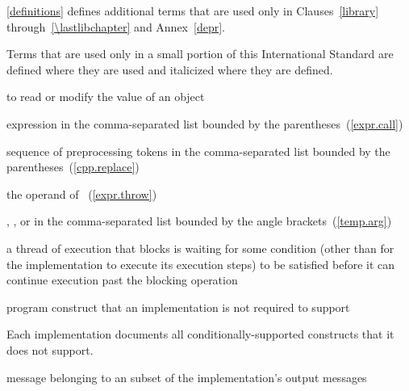 \pnum
\ref{definitions}
defines additional terms that are used only in Clauses~\ref{library}
through~\ref{\lastlibchapter} and Annex~\ref{depr}.

\pnum
Terms that are used only in a small portion of this International
Standard are defined where they are used and italicized where they are
defined.

%
 to read or modify the value of an object

%
 expression in the
comma-separated list bounded by the parentheses~(\ref{expr.call})

%
%
 sequence of preprocessing tokens in the
comma-separated list bounded by the parentheses~(\ref{cpp.replace})

%
%
 the operand of ~(\ref{expr.throw})

%
%
,
, or
 in the comma-separated
list bounded by the angle brackets~(\ref{temp.arg})

%
a thread of execution that blocks is waiting for some condition (other than
for the implementation to execute its execution steps) to be satisfied before
it can continue execution past the blocking operation

%
program construct that an implementation is not required to support\\
\begin{note} Each implementation documents all conditionally-supported
constructs that it does not support.\end{note}

%
message belonging to an  subset of the
implementation's output messages

